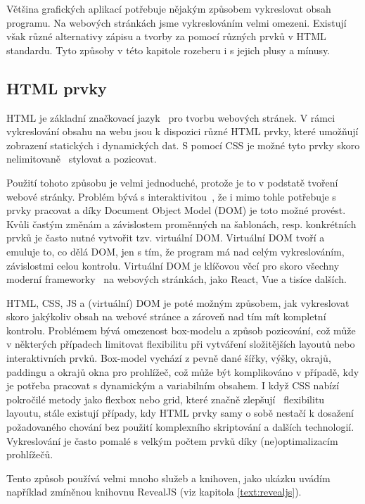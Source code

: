 Většina grafických aplikací potřebuje nějakým způsobem vykreslovat obsah programu.
Na webových stránkách jsme vykreslováním velmi omezeni.
Existují však různé alternativy zápisu a tvorby za pomocí různých prvků v HTML standardu.
Tyto způsoby v této kapitole rozeberu i s jejich plusy a mínusy.

\subsection{HTML prvky}\label{text:vykreslovani/html}

HTML je základní značkovací jazyk~\cite{uzayr2022frontend} pro tvorbu webových stránek. 
V rámci vykreslování obsahu na webu jsou k dispozici různé HTML prvky, které umožňují zobrazení statických i dynamických dat.
S pomocí CSS je možné tyto prvky skoro nelimitovaně~\cite{uzayr2022frontend} stylovat a pozicovat.

Použití tohoto způsobu je velmi jednoduché, protože je to v podstatě tvoření webové stránky.
Problém bývá s interaktivitou~\cite{uzayr2022frontend}, že i mimo tohle potřebuje s prvky pracovat a díky Document Object Model (DOM) je toto možné provést.
Kvůli častým změnám a závislostem proměnných na šablonách, resp. konkrétních prvků je často nutné vytvořit tzv. virtuální DOM.
Virtuální DOM tvoří a emuluje to, co dělá DOM, jen s tím, že program má nad celým vykreslováním, závislostmi celou kontrolu.
Virtuální DOM je klíčovou věcí pro skoro všechny moderní frameworky~\cite{uzayr2022frontend} na webových stránkách, jako React, Vue a tisíce dalších.

HTML, CSS, JS a (virtuální) DOM je poté možným způsobem, jak vykreslovat skoro jakýkoliv obsah na webové stránce a zároveň nad tím mít kompletní kontrolu.
Problémem bývá omezenost box-modelu a způsob pozicování, což může v některých případech limitovat flexibilitu při vytváření složitějších layoutů nebo interaktivních prvků. Box-model vychází z pevně dané šířky, výšky, okrajů, paddingu a okrajů okna pro prohlížeč, což může být komplikováno v případě, kdy je potřeba pracovat s dynamickým a variabilním obsahem. 
I když CSS nabízí pokročilé metody jako flexbox nebo grid, které značně zlepšují~\cite{uzayr2022frontend} flexibilitu layoutu, stále existují případy, kdy HTML prvky samy o sobě nestačí k dosažení požadovaného chování bez použití komplexního skriptování a dalších technologií.
Vykreslování je často pomalé s velkým počtem prvků díky (ne)optimalizacím prohlížečů.

Tento způsob používá velmi mnoho služeb a knihoven, jako ukázku uvádím například zmíněnou knihovnu RevealJS (viz kapitola \ref{text:revealjs}).

